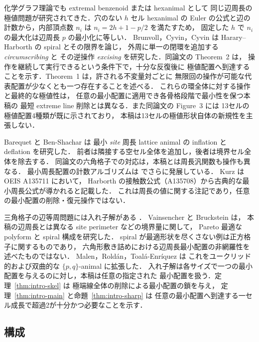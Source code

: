 \documentclass[11pt]{article}
\theoremstyle{plain}
\theoremstyle{definition}
\theoremstyle{remark}
\begin{document}
化学グラフ理論でも extremal benzenoid または hexanimal として
同じ辺周長の極値問題が研究されてきた．穴のない \(h\) セル hexanimal の
Euler の公式と辺の計数から，内部頂点数 \(n_i\) は \(n_i=2h+1-p/2\) を満たすため，
固定した \(h\) で \(n_i\) の最大化は辺周長 \(p\) の最小化に等しい．
Brunvoll，Cyvin，Cyvin \cite{BrunvollCyvinCyvin1993} は
Harary--Harborth の spiral とその限界を論じ，
外周に単一の閉環を追加する \emph{circumscribing} と
その逆操作 \emph{excising} を研究した．同論文の Theorem~2 は，
操作を継続して実行できるという条件下で，十分な反復後に
極値配置へ到達することを示す．Theorem~1 は，許される不変量対ごとに
無限回の操作が可能な代表配置が少なくとも一つ存在することを述べる．
これらの環全体に対する操作と最終的な極値性は，
任意の最小配置に適用でき各骨格段階で最小性を保つ本稿の
最短 extreme line 削除とは異なる．また同論文の Figure~3 には
13セルの極値配置4種類が既に示されており，
本稿は13セルの極値形状自体の新規性を主張しない．

Barequet と Ben-Shachar \cite{BarequetBenShachar2022} は
最小 \emph{site} 周長 lattice animal の inflation と deflation を研究した．
前者は隣接する空セル全体を追加し，後者は境界セル全体を除去する．
同論文の六角格子での対応は，本稿とは周長汎関数も操作も異なる．
最小周長配置の計数アルゴリズムは
\cite{BarequetBenShachar2023} でさらに発展している．
Kurz \cite{OEIS_A135711_Kurz} は OEIS A135711 において，
Harborth の接触数公式（A135708）から古典的な最小周長公式が導かれると記載した．
これは周長の値に関する注記であり，任意の最小配置の削除・復元操作ではない．

三角格子の辺等周問題には入れ子解がある
\cite[Theorem~7.2, p.~135]{Harper2004}．
Vainsencher と Bruckstein \cite{VainsencherBruckstein2008} は，
本稿の辺周長とは異なる site perimeter などの境界量に関して，
Pareto 最適な polyform と spiral 構成を研究した．
spiral が最適形状を尽くさない例は正方格子に関するものであり，
六角形敷き詰めにおける辺周長最小配置の非網羅性を述べたものではない．
Malen，Roldán，Toalá-Enríquez \cite{MalenRoldanToala2023} は
これをユークリッド的および双曲的な \(\{p,q\}\)-animal に拡張した．
入れ子解は各サイズで一つの最小配置を与えるのに対し，本稿は任意の指定された
最小配置を扱う．定理~\ref{thm:intro-skel} は
極端線全体の削除による最小配置の鎖を与え，
定理~\ref{thm:intro-main} と命題~\ref{thm:intro-sharp} は
任意の最小配置へ到達する一セル成長で超過2が十分かつ必要なことを示す．

\subsection{構成}\label{sec:0.6}
\end{document}
